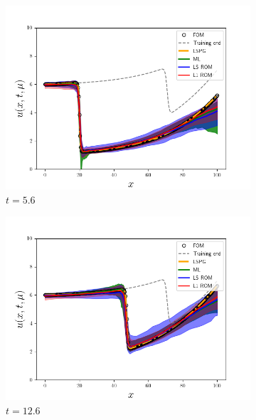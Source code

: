 \documentclass[3p,computermodern,10pt]{elsarticle}
\begin{document}
\begin{figure}
\begin{center}
\begin{subfigure}[t]{0.24\textwidth}
\includegraphics[trim={0cm 0cm 0cm 0cm},clip,width=1.0\linewidth]{code/burgers/synapse_models/basis_study/results/figures/uquartiles_mu1_7_mu2_7_t_0080.png} 
\caption{$t=5.6$}
\end{subfigure}
\begin{subfigure}[t]{0.24\textwidth}
\includegraphics[trim={0cm 0cm 0cm 0cm},clip,width=1.0\linewidth]{code/burgers/synapse_models/basis_study/results/figures/uquartiles_mu1_7_mu2_7_t_0180.png} 
\caption{$t=12.6$}
\end{subfigure}
\begin{subfigure}[t]{0.24\textwidth}

\end{subfigure}
\end{center}
\end{figure}
\end{document}
